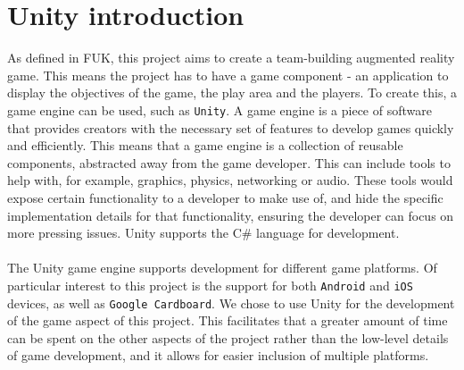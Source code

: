 \section{Unity introduction}\label{sec:unity-intro}
As defined in FUK, this project aims to create a team-building augmented reality game.
This means the project has to have a game component - an application to display the objectives of the game, the play area and the players.
To create this, a game engine can be used, such as \texttt{Unity}.
A game engine is a piece of software that provides creators with the necessary set of features to develop games quickly and efficiently\cite{gameengine}.
This means that a game engine is a collection of reusable components, abstracted away from the game developer.
This can include tools to help with, for example, graphics, physics, networking or audio.
These tools would expose certain functionality to a developer to make use of, and hide the specific implementation details for that functionality, ensuring the developer can focus on more pressing issues.
Unity supports the C\# language for development\cite{unitylanguage}.
\\\\
The Unity game engine supports development for different game platforms.
Of particular interest to this project is the support for both \texttt{Android} and \texttt{iOS} devices, as well as \texttt{Google Cardboard}\cite{unityplatforms}.
We chose to use Unity for the development of the game aspect of this project.
This facilitates that a greater amount of time can be spent on the other aspects of the project rather than the low-level details of game development, and it allows for easier inclusion of multiple platforms.
